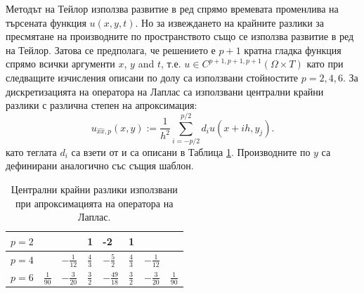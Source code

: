 \documentclass{article}
\begin{document}
Методът на Тейлор използва развитие в ред спрямо времевата променлива на търсената функция $u(x,y,t)$. Но за извеждането на крайните разлики за пресмятане на производните по пространството също се използва развитие в ред на Тейлор. Затова се предполага, че решението е $p+1$ кратна гладка функция спрямо всички аргументи $x$, $y$ and $t$, т.е. $u \in C^{p+1,p+1,p+1}(\Omega \times T)$ като при следващите изчисления описани по долу са използвани стойностите $p=2,4,6$.
За дискретизацията на оператора на Лаплас са използвани централни крайни разлики с различна степен на апроксимация:
\begin{equation}\label{fd}
u_{\widehat{xx},p}(x,y) :=  \frac{1}{h^2} \sum\limits_{i=-p/2}^{p/2} d_i u(x+ih, y_j).
\end{equation}
като теглата $d_i$ са взети от \cite{forn} и са описани в Таблица \ref{table:A00}. Производните по $y$ са дефинирани аналогично със същия шаблон.
\begin{table}[ht]
\centering
\small
		\begin{tabular}{||c|l|l|l|l|l|l|l||}
			\hline
			\hline
            $p=2$          &          &                                 &     1      &   -2   &    1    &    &        \\
   			\hline 
			\hline 
           $p=4$          &                            &   $-\frac{1}{12}$     &     $\frac{4}{3}$      &   $-\frac{5}{2} $     &    $\frac{4}{3}$    &  $-\frac{1}{12}$   &        \\
	   \hline
			\hline 
            $p=6$        &   $\frac{1}{90}$       &     $-\frac{3}{20}$     &    $\frac{3}{2}$      &    $-\frac{49}{18}$   &    $\frac{3}{2}$    & $-\frac{3}{20}$    &    $\frac{1}{90}$       \\
	   \hline
			\hline 
		\end{tabular}
	\caption{Централни крайни разлики използвани при апроксимацията на оператора на Лаплас.}
	\label{table:A00}
\end{table}
\end{document}
